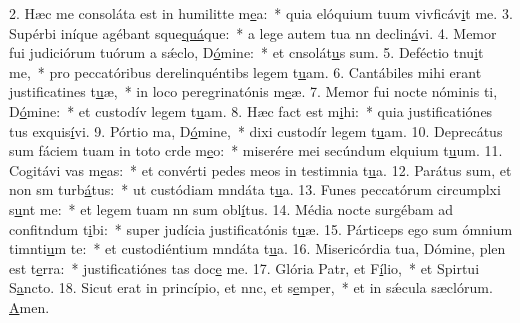 2. Hæc me consoláta est in humilitte m\uline{e}a:~* quia elóquium tuum vivficáv\uline{i}t me.
3. Supérbi iníque agébant sque\uline{quá}que:~* a lege autem tua nn declin\uline{á}vi.
4. Memor fui judiciórum tuórum a sǽclo, D\uline{ó}mine:~* et cnsolát\uline{u}s sum.
5. Deféctio tnu\uline{i}t me,~* pro peccatóribus derelinquéntibs legem t\uline{u}am.
6. Cantábiles mihi erant justificatines t\uline{u}æ,~* in loco peregrinatónis m\uline{e}æ.
7. Memor fui nocte nóminis ti, D\uline{ó}mine:~* et custodív legem t\uline{u}am.
8. Hæc fact est m\uline{i}hi:~* quia justificatiónes tus exquis\uline{í}vi.
9. Pórtio ma, D\uline{ó}mine,~* dixi custodír legem t\uline{u}am.
10. Deprecátus sum fáciem tuam in toto crde m\uline{e}o:~* miserére mei secúndum elquium t\uline{u}um.
11. Cogitávi vas m\uline{e}as:~* et convérti pedes meos in testimnia t\uline{u}a.
12. Parátus sum, et non sm turb\uline{á}tus:~* ut custódiam mndáta t\uline{u}a.
13. Funes peccatórum circumplxi s\uline{u}nt me:~* et legem tuam nn sum obl\uline{í}tus.
14. Média nocte surgébam ad confitndum t\uline{i}bi:~* super judícia justificatónis t\uline{u}æ.
15. Párticeps ego sum ómnium timnti\uline{u}m te:~* et custodiéntium mndáta t\uline{u}a.
16. Misericórdia tua, Dómine, plen est t\uline{e}rra:~* justificatiónes tas doc\uline{e} me.
17. Glória Patr, et F\uline{í}lio,~* et Spirtui S\uline{a}ncto.
18. Sicut erat in princípio, et nnc, et s\uline{e}mper,~* et in sǽcula sæclórum. \uline{A}men.
